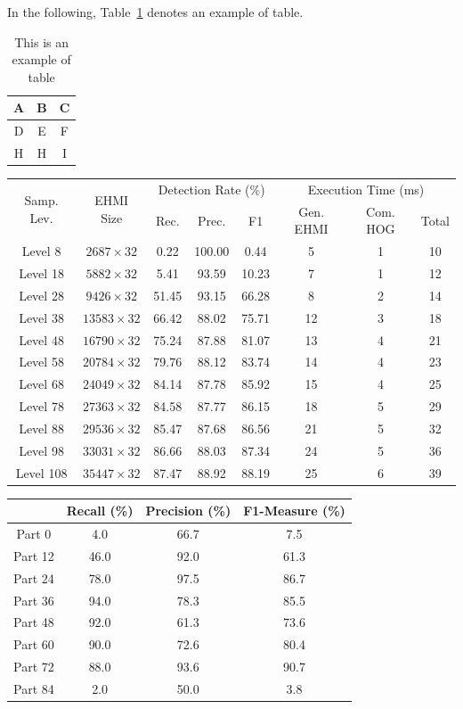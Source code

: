 \documentclass[11pt]{book}
\begin{document}
In the following, Table~\ref{tbl:table1} denotes an example of table.
\begin{table}[ht]
\caption[Table example]{This is an example of table}
\label{tbl:table1}
\centering
\begin{tabular}{c c c}
\hline
A & B & C \tabularnewline \hline
\rowcolor{lightgray}
D & E & F \tabularnewline \hline
H & H & I \tabularnewline \hline
\end{tabular}
\end{table}

\begin{table}
\label{tbl:drandet}
\centering
\begin{tabular}{|c|c|c|c|c|c|c|c|}
\hline
\multirow{2}{*}{Samp. Lev.} & \multirow{2}{*}{EHMI Size} & \multicolumn{3}{c|}{Detection Rate (\%)} & \multicolumn{3}{c|}{Execution Time (ms)} \tabularnewline \hhline{~~------}
& & Rec.  & Prec. & F1 & Gen. EHMI & Com. HOG & Total\\
\hline
Level     8 & $  2687 \times 32$ & 0.22 & 100.00 & 0.44 & 5 & 1 & 10 \tabularnewline \hline
Level   18 & $  5882 \times 32$ & 5.41 & 93.59 & 10.23 & 7 & 1 & 12 \tabularnewline \hline
Level   28 & $  9426 \times 32$ & 51.45 & 93.15 & 66.28 & 8 & 2 & 14 \tabularnewline \hline
Level   38 & $13583 \times 32$ & 66.42 & 88.02 & 75.71 & 12 & 3 & 18 \tabularnewline \hline
Level   48 & $16790 \times 32$ & 75.24 & 87.88 & 81.07 & 13 & 4 & 21 \tabularnewline \hline
Level   58 & $20784 \times 32$ & 79.76 & 88.12 & 83.74 & 14 & 4 & 23 \tabularnewline \hline
\rowcolor{lightgray}
Level   68 & $24049 \times 32$ & 84.14 & 87.78 & 85.92 & 15 & 4 & 25 \tabularnewline \hline
Level   78 & $27363 \times 32$ & 84.58 & 87.77 & 86.15 & 18 & 5 & 29 \tabularnewline \hline
Level   88 & $29536 \times 32$ & 85.47 & 87.68 & 86.56 & 21 & 5 & 32 \tabularnewline \hline
Level   98 & $33031 \times 32$ & 86.66 & 88.03 & 87.34 & 24 & 5 & 36 \tabularnewline \hline
Level 108 & $35447 \times 32$ & 87.47 & 88.92 & 88.19 & 25 & 6 & 39 \tabularnewline \hline
\end{tabular}
\end{table}

\begin{table}
\label{tbl:tbl2}
\centering
\begin{tabular}{c|ccc}
\hline
& Recall  (\%) & Precision (\%) & F1-Measure (\%) \tabularnewline \hline
Part 0 & 4.0 & 66.7 & 7.5 \\
Part 12 & 46.0 & 92.0 & 61.3 \\
\rowcolor{lightgray}
Part 24 & 78.0 & 97.5 & 86.7 \\
Part 36 & 94.0 & 78.3 & 85.5 \\
Part 48 & 92.0 & 61.3 & 73.6 \\
Part 60 & 90.0 & 72.6 & 80.4 \\
\rowcolor{lightgray}
Part 72 & 88.0 & 93.6 & 90.7 \\
Part 84 & 2.0 & 50.0 & 3.8 \tabularnewline \hline
\end{tabular}
\end{table}
\end{document}
